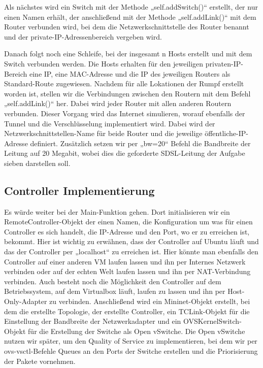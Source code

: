 \documentclass[fontsize=12pt,paper=a4,open=any,parskip=half,
  twoside=false,toc=listof,toc=bibliography,fleqn,leqno,
  captions=nooneline,captions=tableabove,british]{scrbook}
\begin{document}
Als nächstes wird ein Switch mit der Methode „self.addSwitch()“ erstellt, der nur einen Namen erhält, der anschließend mit der Methode „self.addLink()“ mit dem Router verbunden wird, bei dem die Netzwerkschnittstelle des Router benannt und der private-IP-Adressenbereich vergeben wird.
 
Danach folgt noch eine Schleife, bei der insgesamt n Hosts erstellt und mit dem Switch verbunden werden. Die Hosts erhalten für den jeweiligen privaten-IP-Bereich eine IP, eine MAC-Adresse und die IP des jeweiligen Routers als Standard-Route zugewiesen. 
Nachdem für alle Lokationen der Rumpf erstellt worden ist, stellen wir die Verbindungen zwischen den Routern mit dem Befehl „self.addLink()“ her. Dabei wird jeder Router mit allen anderen Routern verbunden. Dieser Vorgang wird das Internet simulieren, worauf ebenfalls der Tunnel und die Verschlüsselung implementiert wird. Dabei wird der Netzwerkschnittstellen-Name für beide Router und die jeweilige öffentliche-IP-Adresse definiert. Zusätzlich setzen wir per „bw=20“ Befehl die Bandbreite der Leitung auf 20 Megabit, wobei dies die geforderte SDSL-Leitung der Aufgabe sieben darstellen soll. 

\subsection{Controller Implementierung}
Es würde weiter bei der Main-Funktion gehen. Dort initialisieren wir ein RemoteController-Objekt der einen Namen, die Konfiguration um was für einen Controller es sich handelt, die IP-Adresse und den Port, wo er zu erreichen ist, bekommt. Hier ist wichtig zu erwähnen, dass der Controller auf Ubuntu läuft und das der Controller per „localhost“ zu erreichen ist. Hier könnte man ebenfalls den Controller auf einer anderen VM laufen lassen und ihn per Internes Netzwerk verbinden oder auf der echten Welt laufen lassen und ihn per NAT-Verbindung verbinden. Auch besteht noch die Möglichkeit den Controller auf dem Betriebssystem, auf dem Virtualbox läuft, laufen zu lassen und ihn per Host-Only-Adapter zu verbinden. Anschließend wird ein Mininet-Objekt erstellt, bei dem die erstellte Topologie, der erstellte Controller, ein TCLink-Objekt für die Einstellung der Bandbreite der Netzwerkadapter und ein OVSKernelSwitch-Objekt für die Erstellung der Switche als Open vSwitche. Die Open vSwitche nutzen wir später, um den Quality of Service zu implementieren, bei dem wir per ovs-vsctl-Befehle Queues an den Ports der Switche erstellen und die Priorisierung der Pakete vornehmen. 
\end{document}
